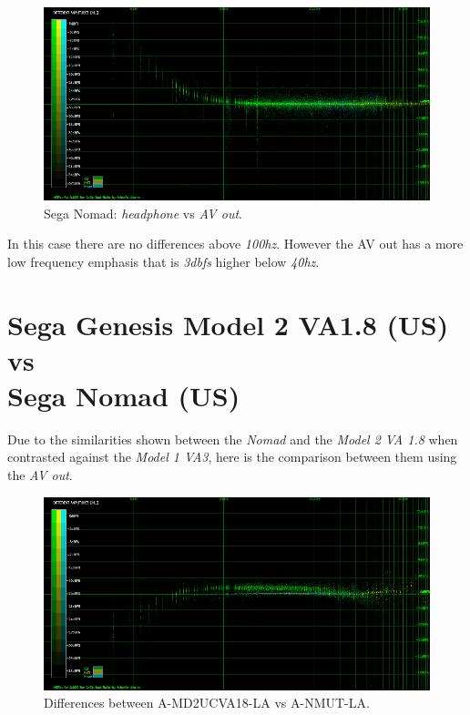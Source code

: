 \documentclass[10pt,a4paper]{report}
\newcommand{\hz}[1]{\textit{\mbox{#1\acrshort{hz}}}}
\newcommand{\db}[1]{\textit{\mbox{#1\acrshort{dbfs}}}}
\begin{document}
\begin{figure}[H]
	\centering
	\includegraphics[width=1.0\linewidth]{images/results/6-A-NMUT-LA_vs_A-NMUT-AV-LA.png}
	\caption[A-NMUT-LA vs A-NMUT-AV-LA]{Sega Nomad: \textit{headphone} vs \textit{AV out}.}
	\label{fig:A-NMUT-LA_vs_A-NMUT-AV-LA}
\end{figure}

In this case there are no differences above \hz{100}. However the AV out has a more low frequency emphasis that is \db{3} higher below \hz{40}.

\section{Sega Genesis Model 2 VA1.8 (US) vs\\ Sega Nomad (US)}

Due to the similarities shown between the \textit{Nomad} and the \textit{Model 2 VA 1.8} when contrasted against the \textit{Model 1 VA3}, here is the comparison between them using the \textit{AV out}.

\begin{figure}[H]
	\centering
	\includegraphics[width=1.0\linewidth]{images/results/7-A-MD2UCVA18-LA_vs_A-NMUT-LA.png}
	\caption[9-A-MD2UCVA18-LA vs A-NMUT-LA]{Differences between A-MD2UCVA18-LA vs A-NMUT-LA.}
	\label{fig:A-MD2UCVA18-LA_vs_A-NMUT-LA}
\end{figure}
\end{document}

